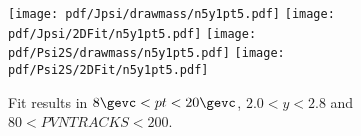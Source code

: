 \begin{figure}[H]
\begin{center}
\texttt{[image: pdf/Jpsi/drawmass/n5y1pt5.pdf]}
\texttt{[image: pdf/Jpsi/2DFit/n5y1pt5.pdf]}
\vspace*{-0.5cm}
\texttt{[image: pdf/Psi2S/drawmass/n5y1pt5.pdf]}
\texttt{[image: pdf/Psi2S/2DFit/n5y1pt5.pdf]}
\vspace*{-0.5cm}
\end{center}
\caption{Fit results in $8\gevc<pt<20\gevc$, $2.0<y<2.8$ and $80<PVNTRACKS<200$.}
\label{Fitn5y1pt5}
\end{figure}

